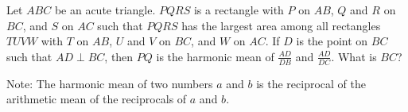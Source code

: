 Let $ABC$ be an acute triangle. $PQRS$ is a rectangle with $P$ on $AB$, $Q$ and $R$ on $BC$, and $S$ on $AC$ such that $PQRS$ has the largest area among all rectangles $TUVW$ with $T$ on $AB$, $U$ and $V$ on $BC$, and $W$ on $AC$. If $D$ is the point on $BC$ such that $AD\perp BC$, then $PQ$ is the harmonic mean of $\frac{AD}{DB}$ and $\frac{AD}{DC}$. What is $BC$?

Note: The harmonic mean of two numbers $a$ and $b$ is the reciprocal of the arithmetic mean of the reciprocals of $a$ and $b$.